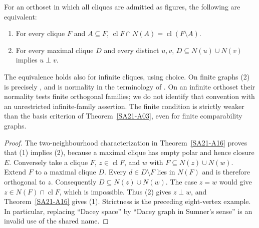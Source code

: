 \begin{theorem}
\label{SA21-A08}
For an orthoset in which all cliques are admitted as figures, the
following are equivalent:
\begin{enumerate}
\item For every clique $F$ and $A\subseteq F$,
$\operatorname{cl}F\cap N(A)=\operatorname{cl}(F\setminus A)$.
\item For every maximal clique $D$ and every distinct $u,v$,
$D\subseteq N(u)\cup N(v)$ implies $u\perp v$.
\end{enumerate}
The equivalence holds also for infinite cliques, using choice. On
finite graphs (2) is precisely \citet[p.~492]{Sumner1974}, and is
normality in the terminology of \citet[Definition 2.4 and Lemma 2.5]
{PasekaVetterlein2022}. On an infinite orthoset their normality tests
finite orthogonal families; we do not identify that convention with
an unrestricted infinite-family assertion. The finite condition is
strictly weaker than the basis criterion
of Theorem~\ref{SA21-A03}, even for finite comparability graphs.
\end{theorem}
\begin{proof}
The two-neighbourhood characterization in
Theorem~\ref{SA21-A16} proves that (1) implies (2), because a maximal
clique has empty polar and hence closure $E$.
Conversely take a clique $F$, $z\in\operatorname{cl}F$, and $w$ with
$F\subseteq N(z)\cup N(w)$. Extend $F$ to a maximal clique $D$.
Every $d\in D\setminus F$ lies in $N(F)$ and is therefore
orthogonal to $z$. Consequently $D\subseteq N(z)\cup N(w)$.
The case $z=w$ would give $z\in N(F)\cap\operatorname{cl}F$,
which is impossible. Thus (2) gives $z\perp w$, and
Theorem~\ref{SA21-A16} gives (1). Strictness is the preceding
eight-vertex example. In particular, replacing ``Dacey space'' by
``Dacey graph in Sumner's sense'' is an invalid use of the shared name.
\end{proof}

